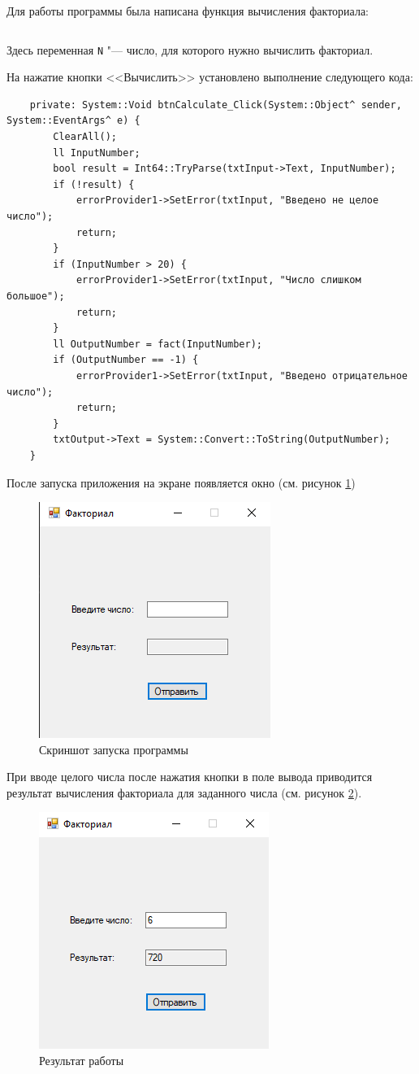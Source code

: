 Для работы программы была написана функция вычисления факториала:
\inputminted[fontsize=\small, breaklines=true, style=bw, linenos]{cpp}{task1/fact.h}
Здесь переменная \verb|N| "--- число, для которого нужно вычислить факториал.

На нажатие кнопки <<Вычислить>> установлено выполнение следующего
кода:
\begin{verbatim}
    private: System::Void btnCalculate_Click(System::Object^ sender, System::EventArgs^ e) {
		ClearAll();
		ll InputNumber;
		bool result = Int64::TryParse(txtInput->Text, InputNumber);
		if (!result) {
			errorProvider1->SetError(txtInput, "Введено не целое число");
			return;
		}
		if (InputNumber > 20) {
			errorProvider1->SetError(txtInput, "Число слишком большое");
			return;
		}
		ll OutputNumber = fact(InputNumber);
		if (OutputNumber == -1) {
			errorProvider1->SetError(txtInput, "Введено отрицательное число");
			return;
		}
		txtOutput->Text = System::Convert::ToString(OutputNumber);
	}
\end{verbatim}

После запуска приложения на экране появляется окно (см. рисунок \ref{fig:exec1})
\begin{figure}[H]
    \centering
    \includegraphics{task1/exec.png}
    \caption{Скриншот запуска программы}
    \label{fig:exec1}
\end{figure}

При вводе целого числа после нажатия кнопки в поле вывода приводится
результат вычисления факториала для заданного числа (см. рисунок \ref{fig:result1}).
\begin{figure}[H]
    \centering
    \includegraphics{task1/result.png}
    \caption{Результат работы}
    \label{fig:result1}
\end{figure}

